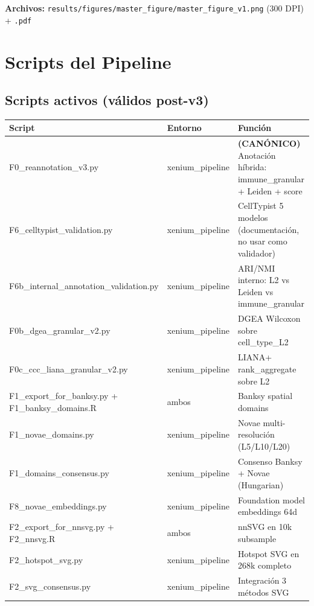 \documentclass[11pt,a4paper]{article}
\begin{document}
\textbf{Archivos:} \texttt{\small results/figures/master\_figure/master\_figure\_v1.png} (300 DPI) + \texttt{.pdf}

\newpage
\section{Scripts del Pipeline}

\subsection{Scripts activos (válidos post-v3)}

\begin{longtable}{|>{\ttfamily}p{6.5cm}|p{2.5cm}|p{4.5cm}|}
\hline
\rowcolor{lightgray}\textbf{Script} & \textbf{Entorno} & \textbf{Función} \\
\hline
F0\_reannotation\_v3.py & xenium\_pipeline & \textbf{(CANÓNICO)} Anotación híbrida: immune\_granular + Leiden + score \\
\hline
F6\_celltypist\_validation.py & xenium\_pipeline & CellTypist 5 modelos (documentación, no usar como validador) \\
\hline
F6b\_internal\_annotation\_validation.py & xenium\_pipeline & ARI/NMI interno: L2 vs Leiden vs immune\_granular \\
\hline
F0b\_dgea\_granular\_v2.py & xenium\_pipeline & DGEA Wilcoxon sobre cell\_type\_L2 \\
\hline
F0c\_ccc\_liana\_granular\_v2.py & xenium\_pipeline & LIANA+ rank\_aggregate sobre L2 \\
\hline
F1\_export\_for\_banksy.py + F1\_banksy\_domains.R & ambos & Banksy spatial domains \\
\hline
F1\_novae\_domains.py & xenium\_pipeline & Novae multi-resolución (L5/L10/L20) \\
\hline
F1\_domains\_consensus.py & xenium\_pipeline & Consenso Banksy + Novae (Hungarian) \\
\hline
F8\_novae\_embeddings.py & xenium\_pipeline & Foundation model embeddings 64d \\
\hline
F2\_export\_for\_nnsvg.py + F2\_nnsvg.R & ambos & nnSVG en 10k subsample \\
\hline
F2\_hotspot\_svg.py & xenium\_pipeline & Hotspot SVG en 268k completo \\
\hline
F2\_svg\_consensus.py & xenium\_pipeline & Integración 3 métodos SVG \\
\hline

\end{longtable}
\end{document}
